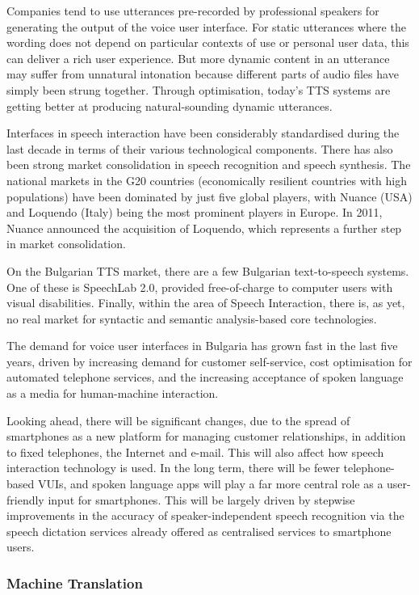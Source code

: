 \begin{multicols}{2}
  Companies tend to use utterances pre-recorded by professional speakers for generating the output of the voice user interface. For static utterances where the wording does not depend on particular contexts of use or personal user data, this can deliver a rich user experience. But more dynamic content in an utterance may suffer from unnatural intonation because different parts of audio files have simply been strung together. Through optimisation, today’s TTS systems are getting better at producing natural-sounding dynamic utterances.

  Interfaces in speech interaction have been considerably standardised during the last decade in terms of their various technological components. There has also been strong market consolidation in speech recognition and speech synthesis. The national markets in the G20 countries (economically resilient countries with high populations) have been dominated by just five global players, with Nuance (USA) and Loquendo (Italy) being the most prominent players in Europe. In 2011, Nuance announced the acquisition of Loquendo, which represents a further step in market consolidation.

  On the Bulgarian TTS market, there are a few Bulgarian text-to-speech systems. One of these is SpeechLab 2.0, provided free-of-charge to computer users with visual disabilities. Finally, within the area of Speech Interaction, there is, as yet, no real market for syntactic and semantic analysis-based core technologies.

  The demand for voice user interfaces in Bulgaria has grown fast in the last five years, driven by increasing demand for customer self-service, cost optimisation for automated telephone services, and the increasing acceptance of spoken language as a media for human-machine interaction. 

  Looking ahead, there will be significant changes, due to the spread of smartphones as a new platform for managing customer relationships, in addition to fixed telephones, the Internet and e-mail. This will also affect how speech interaction technology is used. In the long term, there will be fewer telephone-based VUIs, and spoken language apps will play a far more central role as a user-friendly input for smartphones. This will be largely driven by stepwise improvements in the accuracy of speaker-independent speech recognition via the speech dictation services already offered as centralised services to smartphone users.

  \subsubsection{Machine Translation}


\end{multicols}
